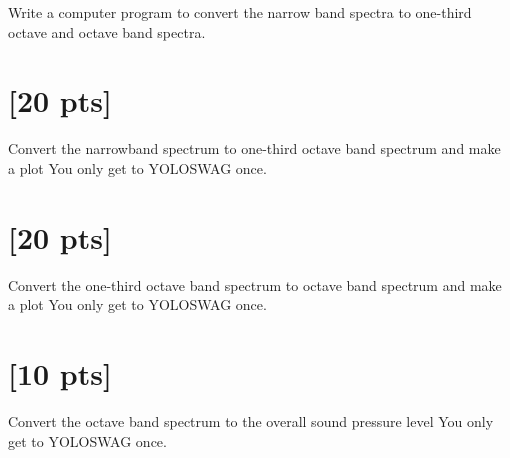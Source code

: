 \documentclass[onecolumn,10pt]{jhwhw}
\begin{document}
\clearpage
\problem{[50 Pts]} Write a computer program to convert the narrow band spectra to one-third octave and octave band spectra.

\part{[20 pts]} Convert the narrowband spectrum to one-third octave band spectrum and make a plot
\solution
You only get to YOLOSWAG once.

\part{[20 pts]} Convert the one-third octave band spectrum to octave band spectrum and make a plot
\solution
You only get to YOLOSWAG once.

\part{[10 pts]} Convert the octave band spectrum to the overall sound pressure level
\solution
You only get to YOLOSWAG once.
\end{document}
